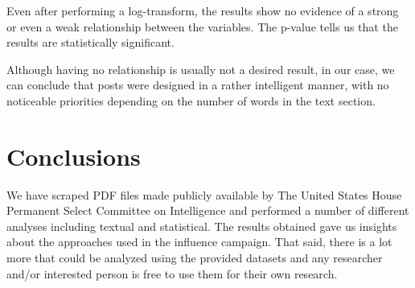 \documentclass[12pt]{article}
\theoremstyle{definition}
\begin{document}
Even after performing a log-transform, the results show no evidence of a strong
or even a weak relationship between the variables. The p-value tells us that
the results are statistically significant.

\bigskip

Although having no relationship is usually not a desired result, in our case,
we can conclude that posts were designed in a rather intelligent manner, with
no noticeable priorities depending on the number of words in the text section.


\section*{\centering Conclusions}

We have scraped PDF files made publicly available by The United States House
Permanent Select Committee on Intelligence and performed a number of different
analyses including textual and statistical. The results obtained gave us
insights about the approaches used in the influence campaign. That said, there
is a lot more that could be analyzed using the provided datasets and any
researcher and/or interested person is free to use them for their own research.


\newpage

\begin{center}
\printbibliography[heading=bibintoc]
\end{center}

\end{document}
